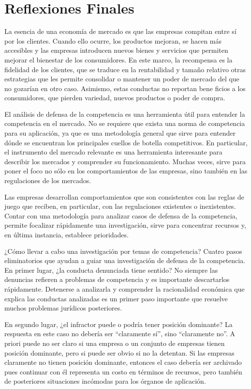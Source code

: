 \documentclass[
  12pt,
  spanish,
]{book}
\begin{document}
\hypertarget{reflexiones-finales}{%
\section{Reflexiones Finales}\label{reflexiones-finales}}

La esencia de una economía de mercado es que las empresas compitan entre sí por los clientes. Cuando ello ocurre, los productos mejoran, se hacen más accesibles y las empresas introducen nuevos bienes y servicios que permiten mejorar el bienestar de los consumidores. En este marco, la recompensa es la fidelidad de los clientes, que se traduce en la rentabilidad y tamaño relativo otras estrategias que les permite consolidar o mantener un poder de mercado del que no gozarían en otro caso. Asimismo, estas conductas no reportan bene ficios a los consumidores, que pierden variedad, nuevos productos o poder de compra.

El análisis de defensa de la competencia es una herramienta útil para entender la competencia en el mercado. No se requiere que exista una norma de competencia para su aplicación, ya que es una metodología general que sirve para entender dónde se encuentran los principales cuellos de botella competitivos. En particular, el instrumento del mercado relevante es una herramienta interesante para describir los mercados y comprender su funcionamiento. Muchas veces, sirve para poner el foco no sólo en los comportamientos de las empresas, sino también en las regulaciones de los mercados.

Las empresas desarrollan comportamientos que son consistentes con las reglas de juego que reciben, en particular, con las regulaciones existentes o inexistentes. Contar con una metodología para analizar casos de defensa de la competencia, permite focalizar rápidamente una investigación, sirve para concentrar recursos y, en última instancia, establece prioridades.

¿Cómo llevar a cabo una investigación por temas de competencia? Cuatro pasos eliminatorios que ayudan a guiar una investigación de defensa de la competencia. En primer lugar, ¿la conducta denunciada tiene sentido? No siempre las denuncias refieren a problemas de competencia y es importante descartarlos rápidamente. Detenerse a analizarla y comprender la racionalidad económica que explica las conductas analizadas es un primer paso importante que resuelve muchos problemas jurídicos posteriores.

En segundo lugar, ¿el infractor puede o podría tener posición dominante? La respuesta en este caso no debería ser ``claramente sí'', sino ``claramente no''. A priori puede no ser claro si una empresa o un conjunto de empresas tienen posición dominante, pero si puede ser obvio si no la detentan. Si las empresas claramente no tienen posición dominante, entonces el caso debería ser archivado pues continuar con él representa un costo en términos de recursos, pero también de posteriores situaciones incómodas para los órganos de aplicación.
\end{document}
